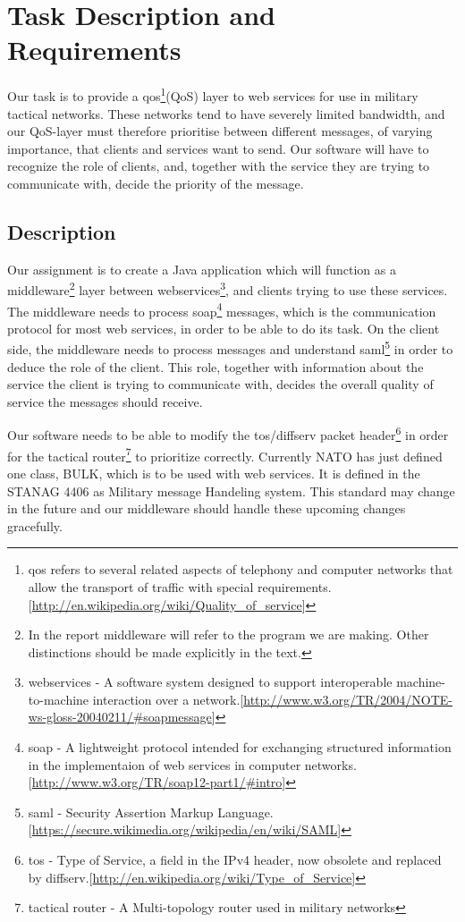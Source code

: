 \section{Task Description and Requirements}\label{Task Description and Requirements} 

    Our task is to provide a \gls{qos}\footnote{\gls{qos} refers to several related aspects of telephony and computer networks that allow the transport of traffic with special requirements.[\url{http://en.wikipedia.org/wiki/Quality_of_service}]}(QoS) layer to web services for use in military tactical networks. These networks tend to have severely limited bandwidth, and our QoS-layer must therefore prioritise between different messages, of varying importance, that clients and services want to send. Our software will have to recognize the role of clients, and, together with the service they are trying to communicate with, decide the priority of the message.
    
    \subsection{Description}\label{Description}        
    Our assignment is to create a Java application which will function as a \gls{middleware}\footnote{In the report \gls{middleware} will refer to the program we are making. Other distinctions should be made explicitly in the text.} layer between \glspl{webservice}\footnote{\glspl{webservice} - A software system designed to support interoperable machine-to-machine interaction over a network.[\url{http://www.w3.org/TR/2004/NOTE-ws-gloss-20040211/\#soapmessage}]}, and clients trying to use these services. The middleware needs to process \gls{soap}\footnote{\gls{soap} - A lightweight protocol intended for exchanging structured information in the implementaion of web services in computer networks.[\url{http://www.w3.org/TR/soap12-part1/\#intro}]} messages, which is the communication protocol for most web services, in order to be able to do its task. On the client side, the middleware needs to process messages and understand \gls{saml}\footnote{\gls{saml} - Security Assertion Markup Language.[\url{https://secure.wikimedia.org/wikipedia/en/wiki/SAML}]} in order to deduce the role of the client. This role, together with information about the service the client is trying to communicate with, decides the overall quality of service the messages should receive. 

    Our software needs to be able to modify the \gls{tos}/\gls{diffserv} \gls{packet} header\footnote{\gls{tos} - Type of Service, a field in the IPv4 header, now obsolete and replaced by diffserv.[\url{http://en.wikipedia.org/wiki/Type_of_Service}]} in order for the \gls{tactical router}\footnote{\Gls{tactical router} - A Multi-topology router used in military networks} to prioritize correctly. Currently NATO has just defined one class, BULK, which is to be used with web services. It is defined in the STANAG 4406 as Military message Handeling system. This standard may change in the future and our middleware should handle these upcoming changes gracefully.

